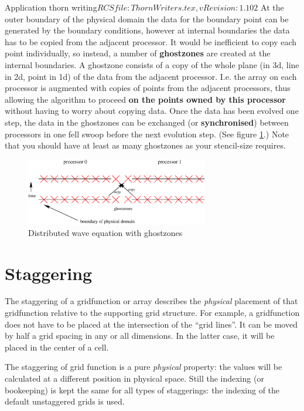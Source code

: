 \begin{cactuspart}{2}{Application thorn writing}{$RCSfile: ThornWriters.tex,v $}{$Revision: 1.102 $}
At the outer boundary of the physical domain the data for the boundary
point can be generated by the boundary conditions, however at internal
boundaries the data has to be copied from the adjacent processor.  It
would be inefficient to copy each point individually, so instead, a
number of {\bf ghostzones} are created at the internal boundaries.  A
ghostzone consists of a copy of the whole plane (in 3d, line in 2d,
point in 1d) of the data from the adjacent processor.  I.e. the array
on each processor is augmented with copies of points from the adjacent
processors, thus allowing the algorithm to proceed {\bf on the points
owned by this processor} without having to worry about copying data.
Once the data has been evolved one step, the data in the ghostzones
can be exchanged (or {\bf synchronised}) between processors in one
fell swoop before the next evolution step.  (See figure
\ref{fig:withghost}.)  Note that you should have at least as many
ghostzones as your stencil-size requires.

\begin{figure}[ht]
\begin{center}
\ifpdf
\else
\includegraphics[angle=0,width=8cm]{withghost.eps}
\fi
\end{center}
\caption{Distributed wave equation with ghostzones}
\label{fig:withghost}
\end{figure}

\section{Staggering}

The staggering of a gridfunction or array describes the {\em physical}
placement of that gridfunction relative to the supporting grid
structure. For example, a gridfunction does not have to
be placed at the intersection
of the ``grid lines''. It can be moved by half a grid spacing in
any or all dimensions. In the latter case, it will be placed in
the center of a cell.

The staggering of grid function is a pure {\em physical} property:
the values will be calculated at a different position in physical
space. Still the indexing (or bookeeping)  is kept the same for all
types of staggerings: the indexing of the default unstaggered grids is
used.


\end{cactuspart}

